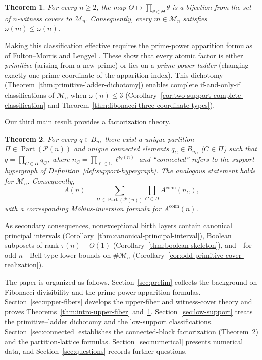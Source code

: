 \documentclass[11pt,letterpaper]{article}
\numberwithin{equation}{section}
\theoremstyle{plain}
\newtheorem{theorem}{Theorem}[section]
\theoremstyle{definition}
\theoremstyle{remark}
\begin{document}
\begin{theorem}\label{thm:intro-witness}
For every $n\ge 2$, the map $\Theta\mapsto\prod_{\theta\in\Theta}\theta$ is
a bijection from the set of $n$-witness covers to $\mathcal M_n$.
Consequently, every $m\in\mathcal M_n$ satisfies $\omega(m)\le\omega(n)$.
\end{theorem}

Making this classification effective requires the prime-power apparition
formulas of Fulton--Morris \cite{FultonMorris1969ArithmeticalFunctions} and
Lengyel \cite{Lengyel1995OrderFibonacciLucas}. These show that every atomic
factor is either \emph{primitive} (arising from a new prime) or lies on a
\emph{prime-power ladder} (changing exactly one prime coordinate of the
apparition index). This dichotomy
(Theorem~\ref{thm:primitive-ladder-dichotomy}) enables complete if-and-only-if
classifications of $\mathcal M_n$ when $\omega(n)\le 3$
(Corollary~\ref{cor:two-support-complete-classification} and
Theorem~\ref{thm:fibonacci-three-coordinate-types}).

Our third main result provides a factorization theory.

\begin{theorem}\label{thm:intro-connected}
For every $q\in B_n$, there exist a unique partition $\Pi\in
\operatorname{Part}(\mathcal P(n))$ and unique connected elements
$q_C\in B_{n_C}$ ($C\in\Pi$) such that $q=\prod_{C\in\Pi}q_C$,
where $n_C=\prod_{\ell\in C}\ell^{\nu_\ell(n)}$ and ``connected'' refers to
the support hypergraph of Definition~\ref{def:support-hypergraph}. The
analogous statement holds for $\mathcal M_n$. Consequently,
\[
A(n)=\sum_{\Pi\in\operatorname{Part}(\mathcal P(n))}
\prod_{C\in\Pi}A^{\mathrm{conn}}(n_C),
\]
with a corresponding M\"obius-inversion formula for
$A^{\mathrm{conn}}(n)$.
\end{theorem}

As secondary consequences, nonexceptional birth layers contain canonical
principal intervals
(Corollary~\ref{thm:canonical-principal-interval}), Boolean subposets of rank
$\tau(n)-O(1)$ (Corollary~\ref{thm:boolean-skeleton}), and---for odd
$n$---Bell-type lower bounds on $\#\mathcal M_n$
(Corollary~\ref{cor:odd-primitive-cover-realization}).

The paper is organized as follows. Section~\ref{sec:prelim} collects the
background on Fibonacci divisibility and the prime-power apparition formulas.
Section~\ref{sec:upper-fibers} develops the upper-fiber and witness-cover
theory and proves Theorems~\ref{thm:intro-upper-fiber}
and~\ref{thm:intro-witness}. Section~\ref{sec:low-support} treats the
primitive--ladder dichotomy and the low-support classifications.
Section~\ref{sec:connected} establishes the connected-block factorization
(Theorem~\ref{thm:intro-connected}) and the partition-lattice formulas.
Section~\ref{sec:numerical} presents numerical data, and
Section~\ref{sec:questions} records further questions.
\end{document}

